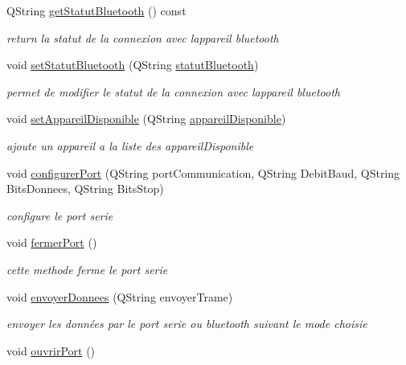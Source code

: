 \begin{DoxyCompactItemize}
Q\+String \hyperlink{class_transmission_adf65c6a49fbbc9d25b7b2fca2c410f99}{get\+Statut\+Bluetooth} () const 
\begin{DoxyCompactList}\small\item\em return la statut de la connexion avec l\textquotesingle{}appareil bluetooth \end{DoxyCompactList}\item 
void \hyperlink{class_transmission_a0680d6aab9c17d11e90566c359187ebc}{set\+Statut\+Bluetooth} (Q\+String \hyperlink{class_transmission_a01afc46fac8c712083225d5dd2386217}{statut\+Bluetooth})
\begin{DoxyCompactList}\small\item\em permet de modifier le statut de la connexion avec l\textquotesingle{}appareil bluetooth \end{DoxyCompactList}\item 
void \hyperlink{class_transmission_ad2c1d8838a1f7ed8d3599dba0a118a86}{set\+Appareil\+Disponible} (Q\+String \hyperlink{class_transmission_ada55d73f163440c8250102cfe74c05a1}{appareil\+Disponible})
\begin{DoxyCompactList}\small\item\em ajoute un appareil a la liste des appareil\+Disponible \end{DoxyCompactList}\item 
void \hyperlink{class_transmission_ab4e82ab30c181a8e0d0c0257ea0e1f56}{configurer\+Port} (Q\+String port\+Communication, Q\+String Debit\+Baud, Q\+String Bits\+Donnees, Q\+String Bits\+Stop)
\begin{DoxyCompactList}\small\item\em configure le port serie \end{DoxyCompactList}\item 
void \hyperlink{class_transmission_a14d36ad615852d6b630fbddf5787f3a3}{fermer\+Port} ()
\begin{DoxyCompactList}\small\item\em cette methode ferme le port serie \end{DoxyCompactList}\item 
void \hyperlink{class_transmission_a21e35372ada18cd35411c0e8c0984fd7}{envoyer\+Donnees} (Q\+String envoyer\+Trame)
\begin{DoxyCompactList}\small\item\em envoyer les données par le port serie ou bluetooth suivant le mode choisie \end{DoxyCompactList}\item 
void \hyperlink{class_transmission_a41d15e65be472e058b28869f8dfad392}{ouvrir\+Port} ()

\end{DoxyCompactItemize}
